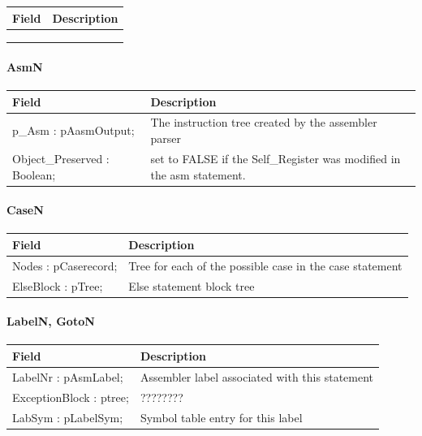 \documentclass [a4paper,12pt]{article}
\begin{document}
\begin{longtable}{|l|p{10cm}|}
\hline
Field	& Description \\
\hline
\endhead
\hline
\endfoot
  &  \\
  &  \\
  & 
\end{longtable}

\paragraph{AsmN}\mbox{}

\begin{longtable}{|l|p{10cm}|}
\hline
Field	& Description \\
\hline
\endhead
\hline
\endfoot
\textsf{p{\_}Asm : pAasmOutput;}&
The instruction tree created by the assembler parser \\
\textsf{Object{\_}Preserved : Boolean;}&
set to FALSE if the Self{\_}Register was modified in the asm statement. 
\label{tab29}
\end{longtable}

\paragraph{CaseN}\mbox{}

\begin{longtable}{|l|p{10cm}|}
\hline
Field	& Description \\
\hline
\endhead
\hline
\endfoot
\textsf{Nodes : pCaserecord;}&
	Tree for each of the possible case in the case statement \\
\textsf{ElseBlock : pTree;}&
	Else statement block tree
\label{tab30}
\end{longtable}

\paragraph{LabelN, GotoN}\mbox{}

\begin{longtable}{|l|p{10cm}|}
\hline
Field	& Description \\
\hline
\endhead
\hline
\endfoot
\textsf{LabelNr : pAsmLabel;}   & Assembler label associated with this statement \\
\textsf{ExceptionBlock : ptree;}& ???????? \\
\textsf{LabSym : pLabelSym;}    & Symbol table entry for this label
\label{tab31}
\end{longtable}
\end{document}
